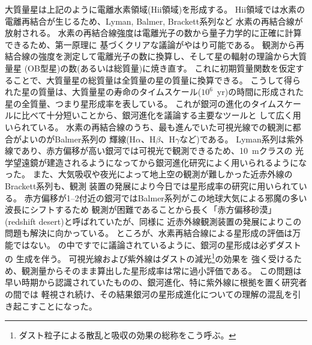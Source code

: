 大質量星は上記のように電離水素領域(H{\sc ii}領域)を形成する。
H{\sc ii}領域では水素の電離再結合が生じるため、Lyman, Balmer, Brackett系列など
水素の再結合線が放射される。
水素の再結合線強度は電離光子の数から量子力学的に正確に計算できるため、第一原理に
基づくクリアな議論がやはり可能である。
観測から再結合線の強度を測定して電離光子の数に換算し、そして星の輻射の理論から大質量星
(OB型星)の数(あるいは総質量)に焼き直す。
これに初期質量関数を仮定することで、大質量星の総質量は全質量の星の質量に換算できる。
こうして得られた星の質量は、大質量星の寿命のタイムスケール($10^6$~yr)の時間に形成された
星の全質量、つまり星形成率を表している\citep{kennicutt1983}。
これが銀河の進化のタイムスケールに比べて十分短いことから、銀河進化を議論する主要なツールと
して広く用いられている。
水素の再結合線のうち、最も進んでいた可視光線での観測に都合がよいのがBalmer系列の
輝線(H$\alpha$、H$\beta$、H$\gamma$など)である。
Lyman系列は紫外線であり、赤方偏移が高い銀河では可視光で観測できるため、10~mクラスの
光学望遠鏡が建造されるようになってから銀河進化研究によく用いられるようになった。
また、大気吸収や夜光によって地上空の観測が難しかった近赤外線のBrackett系列も、観測
装置の発展により今日では星形成率の研究に用いられている。
赤方偏移が1--2付近の銀河ではBalmer系列がこの地球大気による邪魔の多い波長にシフトするため
観測が困難であることから長く「赤方偏移砂漠」(redshift desert)と呼ばれていたが、同様に
近赤外線観測装置の発展によりこの問題も解決に向かっている。
ところが、水素再結合線による星形成の評価は万能ではない。
\citet{kennicutt1983}の中ですでに議論されているように、銀河の星形成は必ずダストの
生成を伴う。
可視光線および紫外線はダストの減光\footnote{ダスト粒子による散乱と吸収の効果の総称をこう呼ぶ。}の効果を
強く受けるため、観測量からそのまま算出した星形成率は常に過小評価である。
この問題は早い時期から認識されていたものの、銀河進化、特に紫外線に根拠を置く研究者の間では
軽視され続け、その結果銀河の星形成進化についての理解の混乱を引き起こすことになった。

